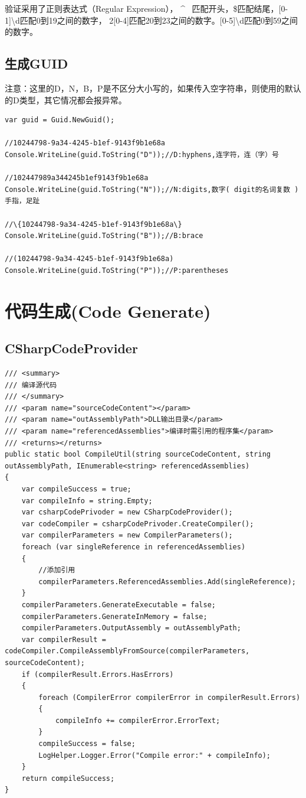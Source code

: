 \documentclass{book}
\begin{document}
验证采用了正则表达式（Regular Expression），
\^ ~匹配开头，\$匹配结尾，[0-1]\textbackslash d匹配0到19之间的数字，
2[0-4]匹配20到23之间的数字。[0-5]\textbackslash d匹配0到59之间的数字。

\subsection{生成GUID}

注意：这里的D，N，B，P是不区分大小写的，如果传入空字符串，则使用的默认的D类型，其它情况都会报异常。

\begin{lstlisting}[language={[Sharp]C}]
var guid = Guid.NewGuid();

//10244798-9a34-4245-b1ef-9143f9b1e68a
Console.WriteLine(guid.ToString("D"));//D:hyphens,连字符，连（字）号

//102447989a344245b1ef9143f9b1e68a
Console.WriteLine(guid.ToString("N"));//N:digits,数字( digit的名词复数 ) 手指，足趾

//\{10244798-9a34-4245-b1ef-9143f9b1e68a\}
Console.WriteLine(guid.ToString("B"));//B:brace

//(10244798-9a34-4245-b1ef-9143f9b1e68a)
Console.WriteLine(guid.ToString("P"));//P:parentheses
\end{lstlisting}

\section{代码生成(Code Generate)}

\subsection{CSharpCodeProvider}

\begin{lstlisting}[language={[Sharp]C},caption=CSharpCodeProvider代码自动生成]
/// <summary>
/// 编译源代码
/// </summary>
/// <param name="sourceCodeContent"></param>
/// <param name="outAssemblyPath">DLL输出目录</param>
/// <param name="referencedAssemblies">编译时需引用的程序集</param>
/// <returns></returns>
public static bool CompileUtil(string sourceCodeContent, string outAssemblyPath, IEnumerable<string> referencedAssemblies)
{
    var compileSuccess = true;
    var compileInfo = string.Empty;
    var csharpCodePrivoder = new CSharpCodeProvider();
    var codeCompiler = csharpCodePrivoder.CreateCompiler();
    var compilerParameters = new CompilerParameters();
    foreach (var singleReference in referencedAssemblies)
    {
        //添加引用
        compilerParameters.ReferencedAssemblies.Add(singleReference);
    }
    compilerParameters.GenerateExecutable = false;
    compilerParameters.GenerateInMemory = false;
    compilerParameters.OutputAssembly = outAssemblyPath;
    var compilerResult = codeCompiler.CompileAssemblyFromSource(compilerParameters, sourceCodeContent);
    if (compilerResult.Errors.HasErrors)
    {
        foreach (CompilerError compilerError in compilerResult.Errors)
        {
            compileInfo += compilerError.ErrorText;
        }
        compileSuccess = false;
        LogHelper.Logger.Error("Compile error:" + compileInfo);
    }
    return compileSuccess;
}
\end{lstlisting}
\end{document}
